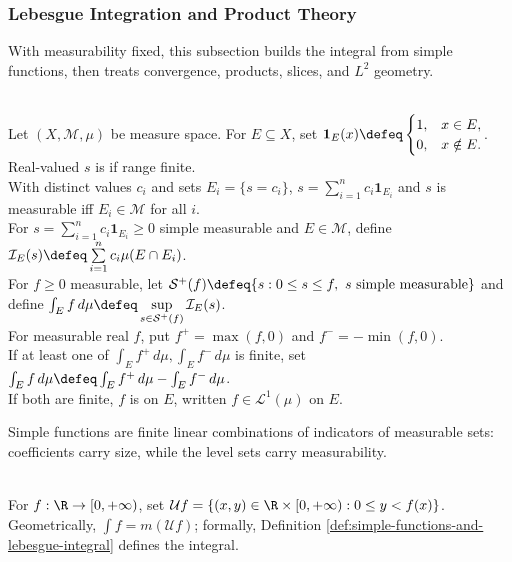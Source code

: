 \subsubsection{Lebesgue Integration and Product Theory}

With measurability fixed, this subsection builds the integral from simple functions, then treats convergence, products, slices, and $L^2$ geometry.

\begin{definition} \label{def:lebesgue-product-core-source-todo}\label{def:simple-functions-and-lebesgue-integral} \\
Let $(X,\mathcal{M},\mu)$ be measure space. For $E\subseteq X$, set $\mathbf{1}_E(x)\defeq
\begin{cases}
1,&x\in E,\\
0,&x\notin E.
\end{cases}$. Real-valued $s$ is  if range finite.\\
With distinct values $c_i$ and sets $E_i=\{s=c_i\}$, $s=\sum\limits_{i=1}^{n}c_i\mathbf{1}_{E_i}$ and $s$ is measurable iff $E_i\in\mathcal{M}$ for all $i$.\\
For $s=\sum_{i=1}^{n}c_i\mathbf{1}_{E_i}\geq0$ simple measurable and $E\in\mathcal{M}$, define $\mathcal{I}_E(s)\defeq\sum\limits_{i=1}^{n}c_i\mu(E\cap E_i)$.\\
For $f\geq0$ measurable, let $\mathcal{S}^+(f)\defeq\{s:0\leq s\leq f,\ s\text{ simple measurable}\}$ and define $\int_E f\,d\mu\defeq\sup\limits_{s\in\mathcal{S}^+(f)}\mathcal{I}_E(s)$.\\
For measurable real $f$, put $f^+=\max(f,0)$ and $f^-=-\min(f,0)$.\\
If at least one of $\int_E f^+\,d\mu,\int_E f^-\,d\mu$ is finite, set $\int_E f\,d\mu\defeq\int_E f^+\,d\mu-\int_E f^-\,d\mu$.\\
If both are finite, $f$ is  on $E$, written $f\in\mathscr{L}^1(\mu)$ on $E$.
\end{definition}

Simple functions are finite linear combinations of indicators of measurable sets: coefficients carry size, while the level sets carry measurability.

\begin{perspective} \label{per:undergraph-geometric-integral} \\
For $f:\R\to[0,+\infty)$, set $\mathcal{U}f=\{(x,y)\in\R\times[0,+\infty):0\leq y<f(x)\}$.\\
Geometrically, $\int f=m(\mathcal{U}f)$; formally, Definition \ref{def:simple-functions-and-lebesgue-integral} defines the integral.
\end{perspective}

